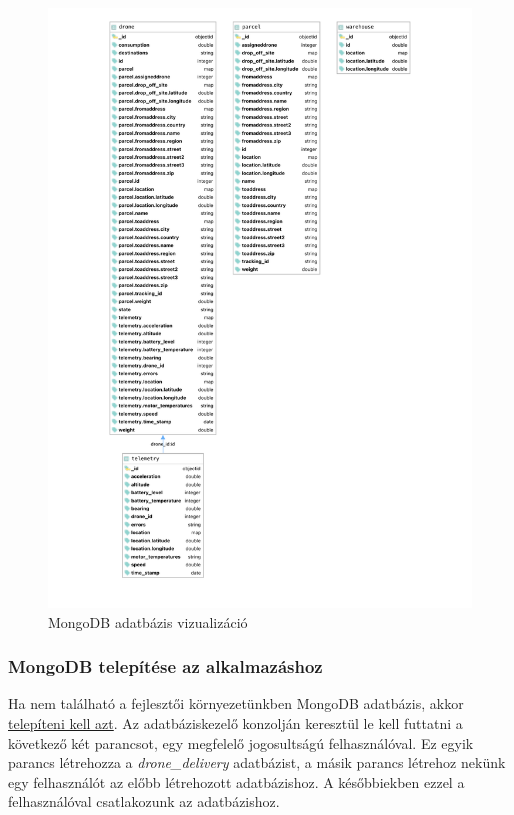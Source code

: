 \begin{figure}[hbt!]
    \centering
    \includegraphics[scale=0.7]{images/mongo.pdf}
    \caption{MongoDB adatbázis vizualizáció}
    \label{fig:mongodb}
\end{figure}

\subsubsection{MongoDB telepítése az alkalmazáshoz}\label{subsubsec:mongodb-telepítése-az-alkalmazáshoz}
Ha nem található a fejlesztői környezetünkben MongoDB adatbázis, akkor \href{https://www.mongodb.com/try/download/community}{telepíteni kell azt}.
Az adatbáziskezelő konzolján keresztül le kell futtatni a következő két parancsot, egy megfelelő jogosultságú felhasználóval.
Ez egyik parancs létrehozza a \textit{drone\_delivery} adatbázist, a másik parancs létrehoz nekünk egy felhasználót az előbb létrehozott adatbázishoz.
A későbbiekben ezzel a felhasználóval csatlakozunk az adatbázishoz.

